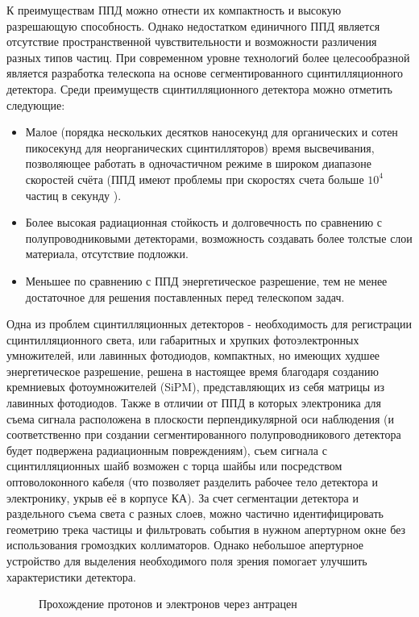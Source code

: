  
К преимуществам ППД можно отнести их компактность и высокую разрешающую способность. Однако недостатком единичного ППД является отсутствие пространственной чувствительности и возможности различения разных типов частиц. При современном уровне технологий более целесообразной является разработка телескопа на основе сегментированного сцинтилляционного детектора. Среди преимуществ сцинтилляционного детектора можно отметить следующие: 
\begin{itemize}
    \item Малое (порядка нескольких десятков  наносекунд для органических и сотен пикосекунд для неорганических сцинтилляторов) время высвечивания, позволяющее работать в одночастичном режиме в широком диапазоне скоростей счёта (ППД имеют проблемы при скоростях счета больше $10^4$ частиц в секунду ).
    \item Более высокая радиационная стойкость и долговечность по сравнению с полупроводниковыми детекторами, возможность создавать более толстые слои материала, отсутствие подложки. 
    \item Меньшее по сравнению с ППД энергетическое разрешение, тем не менее достаточное для решения поставленных перед телескопом задач. 
\end{itemize} 
Одна из проблем сцинтилляционных детекторов - необходимость для регистрации сцинтилляционного света, или габаритных и хрупких  фотоэлектронных умножителей, или лавинных фотодиодов, компактных, но имеющих худшее энергетическое разрешение, решена в настоящее время благодаря созданию кремниевых фотоумножителей (SiPM), представляющих из себя матрицы из лавинных фотодиодов. Также в отличии от ППД в которых  электроника для съема сигнала расположена в плоскости перпендикулярной оси наблюдения (и соответственно при создании сегментированного полупроводникового детектора будет подвержена радиационным повреждениям), съем сигнала с сцинтилляционных шайб возможен с торца шайбы или посредством оптоволоконного кабеля (что позволяет разделить рабочее тело детектора и электронику, укрыв её в корпусе КА).
За счет сегментации детектора и раздельного съема света с разных слоев, можно частично идентифицировать геометрию трека частицы и фильтровать события в нужном апертурном окне без использования громоздких коллиматоров. Однако небольшое апертурное устройство для выделения необходимого поля зрения помогает улучшить характеристики детектора.

\begin{figure}[ht]
    \caption{Прохождение протонов и электронов через антрацен}\label{sat:antrachen}
\end{figure}

